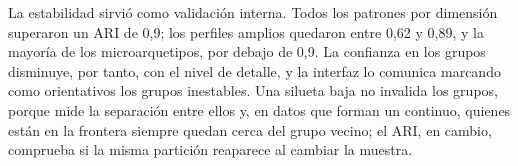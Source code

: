 La estabilidad sirvió como validación interna. Todos los patrones por dimensión superaron un ARI de 0,9; los perfiles amplios quedaron entre 0,62 y 0,89, y la mayoría de los microarquetipos, por debajo de 0,9. La confianza en los grupos disminuye, por tanto, con el nivel de detalle, y la interfaz lo comunica marcando como orientativos los grupos inestables. Una silueta baja no invalida los grupos, porque mide la separación entre ellos y, en datos que forman un continuo, quienes están en la frontera siempre quedan cerca del grupo vecino; el ARI, en cambio, comprueba si la misma partición reaparece al cambiar la muestra.

